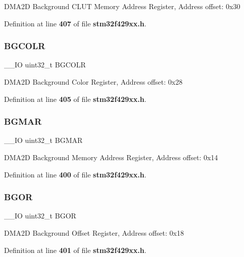 D\+M\+A2D Background C\+L\+UT Memory Address Register, Address offset\+: 0x30 

Definition at line \textbf{ 407} of file \textbf{ stm32f429xx.\+h}.

\mbox{\label{structDMA2D__TypeDef_a1b655471716402cff4ef1d584da01ea6}} 
\subsubsection{B\+G\+C\+O\+LR}
{\footnotesize\ttfamily \+\_\+\+\_\+\+IO uint32\+\_\+t B\+G\+C\+O\+LR}

D\+M\+A2D Background Color Register, Address offset\+: 0x28 

Definition at line \textbf{ 405} of file \textbf{ stm32f429xx.\+h}.

\mbox{\label{structDMA2D__TypeDef_a2ab8fa08f05f63b322b38013283e6fa0}} 
\subsubsection{B\+G\+M\+AR}
{\footnotesize\ttfamily \+\_\+\+\_\+\+IO uint32\+\_\+t B\+G\+M\+AR}

D\+M\+A2D Background Memory Address Register, Address offset\+: 0x14 

Definition at line \textbf{ 400} of file \textbf{ stm32f429xx.\+h}.

\mbox{\label{structDMA2D__TypeDef_a29e2e00c79be42d49f6f189c207cc664}} 
\subsubsection{B\+G\+OR}
{\footnotesize\ttfamily \+\_\+\+\_\+\+IO uint32\+\_\+t B\+G\+OR}

D\+M\+A2D Background Offset Register, Address offset\+: 0x18 

Definition at line \textbf{ 401} of file \textbf{ stm32f429xx.\+h}.

\mbox{\label{structDMA2D__TypeDef_a2ad24a3135aa498ba6691f6a114a9826}} 
